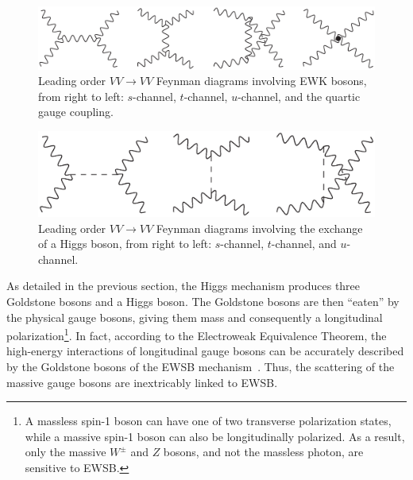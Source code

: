 \begin{figure}[htbp]
  \centering
  \includegraphics[height=.125\textheight]{figs/theory/vbs_ewk}
  \caption{Leading order $VV\rightarrow VV$ Feynman diagrams involving EWK bosons, from right to left: $s$-channel, $t$-channel, $u$-channel, and the quartic gauge coupling.}
  \label{fig:theory_vbs_ewk}
\end{figure}
\begin{figure}[htbp]
  \centering
  \includegraphics[height=.125\textheight]{figs/theory/vbs_higgs}
  \caption{Leading order $VV\rightarrow VV$ Feynman diagrams involving the exchange of a Higgs boson, from right to left: $s$-channel, $t$-channel, and $u$-channel.}
  \label{fig:theory_vbs_higgs}
\end{figure}

As detailed in the previous section, the Higgs mechanism produces three Goldstone bosons and a Higgs boson.
The Goldstone bosons are then ``eaten'' by the physical gauge bosons, giving them mass and consequently a longitudinal polarization\footnote{A massless spin-1 boson can have one of two transverse polarization states, while a massive spin-1 boson can also be longitudinally polarized.  As a result, only the massive $W^{\pm}$ and $Z$ bosons, and not the massless photon, are sensitive to EWSB.}.
In fact, according to the Electroweak Equivalence Theorem, the high-energy interactions of longitudinal gauge bosons can be accurately described by the Goldstone bosons of the EWSB mechanism~\cite{1997.ewk-equivalence}.
Thus, the scattering of the massive gauge bosons are inextricably linked to EWSB.

